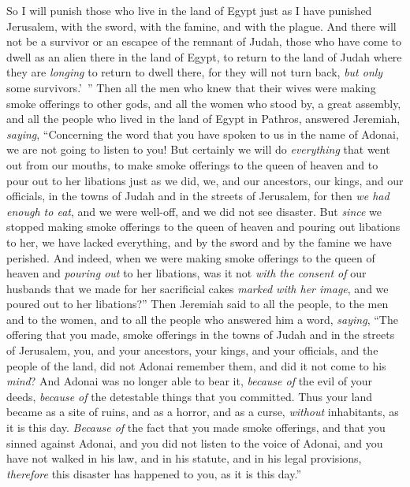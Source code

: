 \begin{biblechapter}
\verse So I will punish those who live in the land of Egypt just as I have punished Jerusalem, with the sword, with the famine, and with the plague.
\verse And there will not be a survivor or an escapee of the remnant of Judah, those who have come to dwell as an alien there in the land of Egypt, to return to the land of Judah where they are \textit{longing} to return to dwell there, for they will not turn back, \textit{but only} some survivors.’ ”
\verse Then all the men who knew that their wives were making smoke offerings to other gods, and all the women who stood by, a great assembly, and all the people who lived in the land of Egypt in Pathros, answered Jeremiah, \textit{saying},
\verse “Concerning the word that you have spoken to us in the name of Adonai, we are not going to listen to you!
\verse But certainly we will do \textit{everything} that went out from our mouths, to make smoke offerings to the queen of heaven and to pour out to her libations just as we did, we, and our ancestors, our kings, and our officials, in the towns of Judah and in the streets of Jerusalem, for then \textit{we had enough to eat}, and we were well-off, and we did not see disaster.
\verse But \textit{since} we stopped making smoke offerings to the queen of heaven and pouring out libations to her, we have lacked everything, and by the sword and by the famine we have perished.
\verse And indeed, when we were making smoke offerings to the queen of heaven and \textit{pouring out} to her libations, was it not \textit{with the consent of} our husbands that we made for her sacrificial cakes \textit{marked with her image}, and we poured out to her libations?”
\verse Then Jeremiah said to all the people, to the men and to the women, and to all the people who answered him a word, \textit{saying},
\verse “The offering that you made, smoke offerings in the towns of Judah and in the streets of Jerusalem, you, and your ancestors, your kings, and your officials, and the people of the land, did not Adonai remember them, and did it not come to his \textit{mind}?
\verse And Adonai was no longer able to bear it, \textit{because of} the evil of your deeds, \textit{because of} the detestable things that you committed. Thus your land became as a site of ruins, and as a horror, and as a curse, \textit{without} inhabitants, as it is this day.
\verse \textit{Because of} the fact that you made smoke offerings, and that you sinned against Adonai, and you did not listen to the voice of Adonai, and you have not walked in his law, and in his statute, and in his legal provisions, \textit{therefore} this disaster has happened to you, as it is this day.”

\end{biblechapter}
